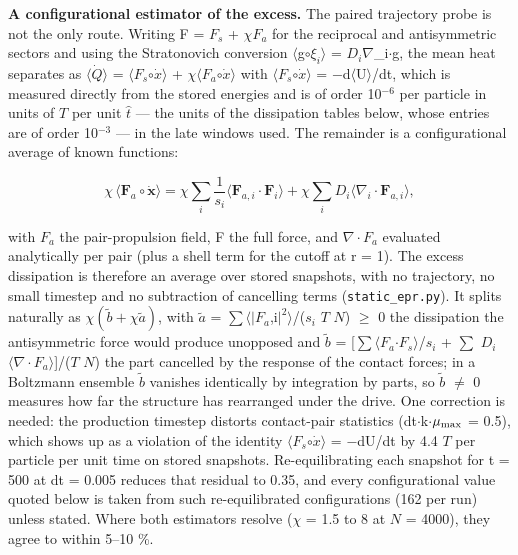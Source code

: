\documentclass[aps,pre,preprint,superscriptaddress,nofootinbib,longbibliography]{revtex4-2}
\begin{document}
\textbf{A configurational estimator of the excess.} The paired trajectory probe is not the only route. Writing F = $F_{s}$ + $\chi$$F_{a}$ for the reciprocal and antisymmetric sectors and using the Stratonovich conversion $\langle$g$\circ$$\xi_{i}$$\rangle$ = $D_{i}$$\nabla$\_i$\cdot$g, the mean heat separates as $\langle \dot{Q} \rangle$ = $\langle$$F_{s}$$\circ \dot{x} \rangle$ + $\chi \langle$$F_{a}$$\circ \dot{x} \rangle$ with $\langle$$F_{s}$$\circ \dot{x} \rangle$ = $-$d$\langle$U$\rangle$/dt, which is measured directly from the stored energies and is of order 10$^{-6}$ per particle in units of $T$ per unit $\hat{t}$ --- the units of the dissipation tables below, whose entries are of order 10$^{-3}$ --- in the late windows used. The remainder is a configurational average of known functions:

\begin{equation}
\chi\,\langle\mathbf{F}_a\circ\dot{\mathbf{x}}\rangle=\chi\sum_i\frac{1}{s_i}\langle\mathbf{F}_{a,i}\cdot\mathbf{F}_i\rangle+\chi\sum_i D_i\langle\nabla_i\cdot\mathbf{F}_{a,i}\rangle,
\end{equation}

with $F_{a}$ the pair-propulsion field, F the full force, and $\nabla \cdot$$F_{a}$ evaluated analytically per pair (plus a shell term for the cutoff at r = 1). The excess dissipation is therefore an average over stored snapshots, with no trajectory, no small timestep and no subtraction of cancelling terms (\texttt{static\_epr.py}). It splits naturally as $\chi(\tilde b+\chi\tilde a)$, with $\tilde a$ = $\sum \langle |$$F_{a}$,i$| ^{2} \rangle$/($s_{i}$ $T$ $N$) $\ge$ 0 the dissipation the antisymmetric force would produce unopposed and $\tilde b$ = [$\sum \langle$$F_{a}$$\cdot$$F_{s}$$\rangle$/$s_{i}$ + $\sum$ $D_{i}$$\langle \nabla \cdot$$F_{a}$$\rangle$]/($T$ $N$) the part cancelled by the response of the contact forces; in a Boltzmann ensemble $\tilde b$ vanishes identically by integration by parts, so $\tilde b$ $\neq$ 0 measures how far the structure has rearranged under the drive. One correction is needed: the production timestep distorts contact-pair statistics (dt$\cdot$k$\cdot$$\mu_{\rm max}$ = 0.5), which shows up as a violation of the identity $\langle$$F_{s}$$\circ \dot{x} \rangle$ = $-$dU/dt by 4.4 $T$ per particle per unit time on stored snapshots. Re-equilibrating each snapshot for t = 500 at dt = 0.005 reduces that residual to 0.35, and every configurational value quoted below is taken from such re-equilibrated configurations (162 per run) unless stated. Where both estimators resolve ($\chi$ = 1.5 to 8 at $N$ = 4000), they agree to within 5--10 \%.
\end{document}
